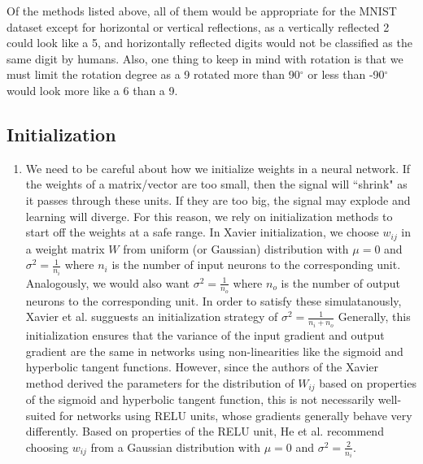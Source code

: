 \documentclass[a4paper]{article}
\begin{document}
\begin{enumerate}
{Of the methods listed above, all of them would be appropriate for the MNIST dataset except for horizontal or vertical reflections, as a vertically reflected 2 could look like a 5, and horizontally reflected digits would not be classified as the same digit by humans. Also, one thing to keep in mind with rotation is that we must limit the rotation degree as a 9 rotated more than 90$^{\circ}$ or less than -90$^{\circ}$ would look more like a 6 than a 9.

}
\end{enumerate}

\subsection{Initialization}
\begin{enumerate}
\item{ We need to be careful about how we initialize weights in a neural network. If the weights of a matrix/vector are too small, then the signal will ``shrink" as it passes through these units. If they are too big, the signal may explode and learning will diverge. For this reason, we rely on initialization methods to start off the weights at a safe range. 
\newline
\newline
In Xavier initialization, we choose $w_{ij}$ in a weight matrix $W$ from uniform (or Gaussian) distribution with $\mu=0$ and $\sigma^2 = \frac{1}{n_i}$ where $n_i$ is the number of input neurons to the corresponding unit. Analogously, we would also want $\sigma^2 = \frac{1}{n_o}$ where $n_o$ is the number of output neurons to the corresponding unit. In order to satisfy these simulatanously, Xavier et al. sugguests an initialization strategy of $\sigma^2 = \frac{1}{n_i + n_o}$ Generally, this initialization ensures that the variance of the input gradient and output gradient are the same in networks using non-linearities like the sigmoid and hyperbolic tangent functions.
\newline
\newline
However, since the authors of the Xavier method derived the parameters for the distribution of $W_{ij}$ based on properties of the sigmoid and hyperbolic tangent function, this is not necessarily well-suited for networks using RELU units, whose gradients generally behave very differently. Based on properties of the RELU unit, He et al. recommend choosing $w_{ij}$ from a Gaussian distribution with $\mu=0$ and $\sigma^2=\frac{2}{n_i}$. 

}
\end{enumerate}
\end{document}

